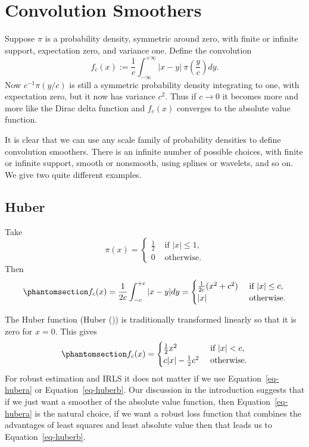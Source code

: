 \documentclass[
  12pt,
  letterpaper,
  DIV=11,
  numbers=noendperiod]{scrartcl}
\newcommand{\sectionbreak}{\pagebreak}
\theoremstyle{definition}
\theoremstyle{plain}
\theoremstyle{plain}
\theoremstyle{remark}
\begin{document}
\sectionbreak

\section{Convolution Smoothers}\label{convolution-smoothers}

Suppose \(\pi\) is a probability density, symmetric around zero, with
finite or infinite support, expectation zero, and variance one. Define
the convolution \[
f_c(x):=\frac{1}{c}\int_{-\infty}^{+\infty}|x-y|\ \pi(\frac{y}{c})dy.
\] Now \(c^{-1}\pi(y/c)\) is still a symmetric probability density
integrating to one, with expectation zero, but it now has variance
\(c^2\). Thus if \(c\rightarrow 0\) it becomes more and more like the
Dirac delta function and \(f_c(x)\) converges to the absolute value
function.

It is clear that we can use any scale family of probability densities to
define convolution smoothers. There is an infinite number of possible
choices, with finite or infinite support, smooth or nonsmooth, using
splines or wavelets, and so on. We give two quite different examples.

\subsection{Huber}\label{huber}

Take \[
\pi(x)=\begin{cases}\frac12 &\text{ if }|x|\leq 1,\\0&\text{ otherwise.}\end{cases}
\] Then \begin{equation}\phantomsection\label{eq-hubera}{
f_c(x)=\frac{1}{2c}\int_{-c}^{+c}|x-y|dy=\begin{cases}
\frac{1}{2c}(x^2+c^2)&\text{ if }|x|\leq c,\\
|x|&\text{ otherwise}.
\end{cases}
}\end{equation}

The Huber function (Huber ()) is
traditionally transformed linearly so that it is zero for \(x=0\). This
gives \begin{equation}\phantomsection\label{eq-huberb}{
f_c(x)=\begin{cases}
\frac12x^2&\text{ if }|x|<c,\\
c|x|-\frac12 c^2&\text{ otherwise}.
\end{cases}
}\end{equation} For robust estimation and IRLS it does not matter if we
use Equation~\ref{eq-hubera} or Equation~\ref{eq-huberb}. Our discussion
in the introduction suggests that if we just want a smoother of the
absolute value function, then Equation~\ref{eq-hubera} is the natural
choice, if we want a robust loss function that combines the advantages
of least squares and least absolute value then that leads us to
Equation~\ref{eq-huberb}.
\end{document}
